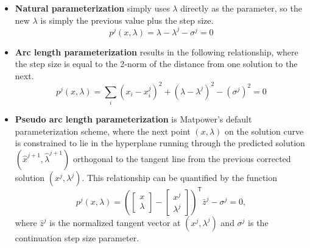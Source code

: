 \documentclass[12pt]{article}
\newcommand{\matpower}[0]{{\sc Matpower}}
\newcommand{\trans}[1]{{#1}^{\ensuremath{\mathsf{T}}}}  %
\numberwithin{equation}{section}
\numberwithin{table}{section}
\numberwithin{figure}{section}
\begin{document}
\begin{itemize}

\item{\bf Natural parameterization} simply uses $\lambda$ directly as the parameter, so the new $\lambda$ is simply the previous value plus the step size.
\begin{equation}
p^j(x,\lambda) = \lambda - \lambda^j - \sigma^j = 0
\label{eq:natural_parm}
\end{equation}

\item {\bf Arc length parameterization} results in the following relationship, where the step size is equal to the 2-norm of the distance from one solution to the next.
\begin{equation}
p^j(x,\lambda) = \sum\limits_i(x_i - x_i^j)^2 + (\lambda - \lambda^j)^2 - (\sigma^j)^2 = 0
\label{eq:arc_parm}
\end{equation}
\item {\bf Pseudo arc length parameterization} \cite{mori2002} is \matpower{}'s default parameterization scheme, where the next point $(x,\lambda)$ on the solution curve is constrained to lie in the hyperplane running through the predicted solution $(\hat{x}^{j+1}, \hat{\lambda}^{j+1})$ orthogonal to the tangent line from the previous corrected solution $(x^j,\lambda^j)$. This relationship can be quantified by the function
\begin{equation}
p^j(x,\lambda) = \trans{ \left(\left[\begin{array}{c}x \\ \lambda\end{array}\right] - \left[\begin{array}{c}x^{j} \\ \lambda^j\end{array}\right]\right) } \bar{z}^j -\sigma^j = 0,
\label{eq:psuedo_arc_parm}
\end{equation}
where $\bar{z}^j$ is the normalized tangent vector at $(x^j, \lambda^j)$ and $\sigma^j$ is the continuation step size parameter.

\end{itemize}
\end{document}
